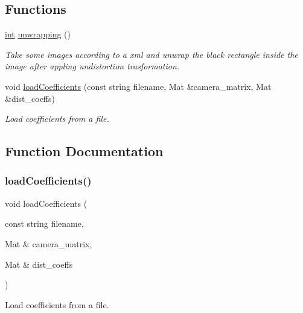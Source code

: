 \subsection*{Functions}
\begin{DoxyCompactItemize}
\item 
\mbox{\hyperlink{draw_8hh_aa620a13339ac3a1177c86edc549fda9b}{int}} \mbox{\hyperlink{unwrapping_8hh_ae232c3264987d57a223a39226929da29}{unwrapping}} ()
\begin{DoxyCompactList}\small\item\em Take some images according to a xml and unwrap the black rectangle inside the image after appling undistortion trasformation. \end{DoxyCompactList}\item 
void \mbox{\hyperlink{unwrapping_8hh_a3cf7df08897ed4d1a7ddcf055b18cca8}{load\+Coefficients}} (const string filename, Mat \&camera\+\_\+matrix, Mat \&dist\+\_\+coeffs)
\begin{DoxyCompactList}\small\item\em Load coefficients from a file. \end{DoxyCompactList}\end{DoxyCompactItemize}


\subsection{Function Documentation}
\mbox{\label{unwrapping_8hh_a3cf7df08897ed4d1a7ddcf055b18cca8}} 
\subsubsection{\texorpdfstring{loadCoefficients()}{loadCoefficients()}}
{\footnotesize\ttfamily void load\+Coefficients (\begin{DoxyParamCaption}\item[{const string}]{filename,  }\item[{Mat \&}]{camera\+\_\+matrix,  }\item[{Mat \&}]{dist\+\_\+coeffs }\end{DoxyParamCaption})}



Load coefficients from a file. 

